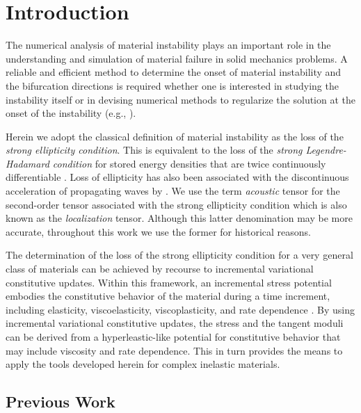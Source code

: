 \documentclass[12pt]{article}
\numberwithin{equation}{section}
\begin{document}
\section{Introduction}
\label{sec:intro}

The numerical analysis of material instability plays an important role
in the understanding and simulation of material failure in solid
mechanics problems. A reliable and efficient method to determine the
onset of material instability and the bifurcation directions is
required whether one is interested in studying the instability itself
or in devising numerical methods to regularize the solution at the
onset of the instability (e.g., \cite{Simo.etal:1993, Oliver:1996a,
  Oliver:1996b, Armero.Garikipati:1996, Moes.Belytschko:2002,
  Foster.etal:2007, Chen.etal:2011}).

Herein we adopt the classical definition of material instability as
the loss of the \emph{strong ellipticity condition}. This is
equivalent to the loss of the \emph{strong Legendre-Hadamard
  condition} for stored energy densities that are twice continuously
differentiable \citep{Antman:2005}. Loss of ellipticity has also been
associated with the discontinuous acceleration of propagating waves by
\citet{Hill:1962}. We use the term \emph{acoustic} tensor for the
second-order tensor associated with the strong ellipticity condition
which is also known as the \emph{localization} tensor. Although this
latter denomination may be more accurate, throughout this work we use
the former for historical reasons.

The determination of the loss of the strong ellipticity condition for
a very general class of materials can be achieved by recourse to
incremental variational constitutive updates. Within this framework,
an incremental stress potential embodies the constitutive behavior of
the material during a time increment, including elasticity,
viscoelasticity, viscoplasticity, and rate dependence
\citep{Ortiz.Stainier:1999, Lambrecht.etal:2003, Miehe.etal:2004,
  Weinberg.etal:2006, Fancello.etal:2006, Mosler.Bruhns:2010,
  Bleier.Mosler:2012}. By using incremental variational constitutive
updates, the stress and the tangent moduli can be derived from a
hyperleastic-like potential for constitutive behavior that may include
viscosity and rate dependence. This in turn provides the means to
apply the tools developed herein for complex inelastic materials.

\subsection{Previous Work}
\end{document}
